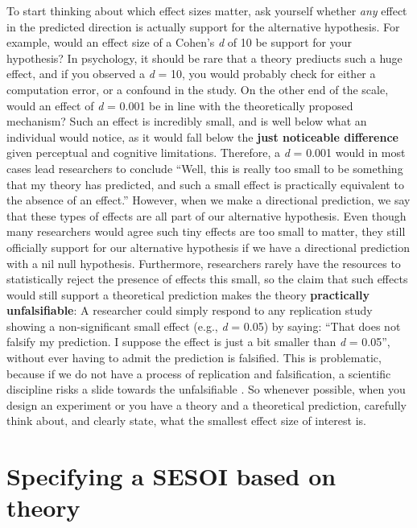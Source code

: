 \documentclass[
  oneside]{krantz}
\begin{document}
To start thinking about which effect sizes matter, ask yourself whether \emph{any} effect in the predicted direction is actually support for the alternative hypothesis. For example, would an effect size of a Cohen's \emph{d} of 10 be support for your hypothesis? In psychology, it should be rare that a theory prediucts such a huge effect, and if you observed a \emph{d} = 10, you would probably check for either a computation error, or a confound in the study. On the other end of the scale, would an effect of \emph{d} = 0.001 be in line with the theoretically proposed mechanism? Such an effect is incredibly small, and is well below what an individual would notice, as it would fall below the \textbf{just noticeable difference} given perceptual and cognitive limitations. Therefore, a \emph{d} = 0.001 would in most cases lead researchers to conclude ``Well, this is really too small to be something that my theory has predicted, and such a small effect is practically equivalent to the absence of an effect.'' However, when we make a directional prediction, we say that these types of effects are all part of our alternative hypothesis. Even though many researchers would agree such tiny effects are too small to matter, they still officially support for our alternative hypothesis if we have a directional prediction with a nil null hypothesis. Furthermore, researchers rarely have the resources to statistically reject the presence of effects this small, so the claim that such effects would still support a theoretical prediction makes the theory \textbf{practically unfalsifiable}: A researcher could simply respond to any replication study showing a non-significant small effect (e.g., \emph{d} = 0.05) by saying: ``That does not falsify my prediction. I suppose the effect is just a bit smaller than \emph{d} = 0.05'', without ever having to admit the prediction is falsified. This is problematic, because if we do not have a process of replication and falsification, a scientific discipline risks a slide towards the unfalsifiable \citep{ferguson_vast_2012}. So whenever possible, when you design an experiment or you have a theory and a theoretical prediction, carefully think about, and clearly state, what the smallest effect size of interest is.

\hypertarget{specifying-a-sesoi-based-on-theory}{%
\section{Specifying a SESOI based on theory}\label{specifying-a-sesoi-based-on-theory}}
\end{document}
